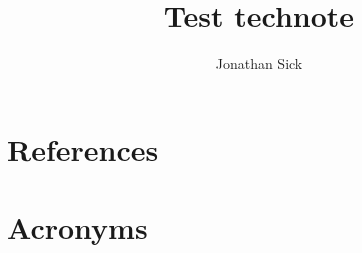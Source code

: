 \documentclass[DM,authoryear,toc]{lsstdoc}
\title{Test technote}
\author{%
Jonathan Sick
}
\date{\vcsDate}
\begin{document}
\maketitle


\appendix
\section{References} \label{sec:bib}
\renewcommand{\refname}{} %


\section{Acronyms} \label{sec:acronyms}

\end{document}
